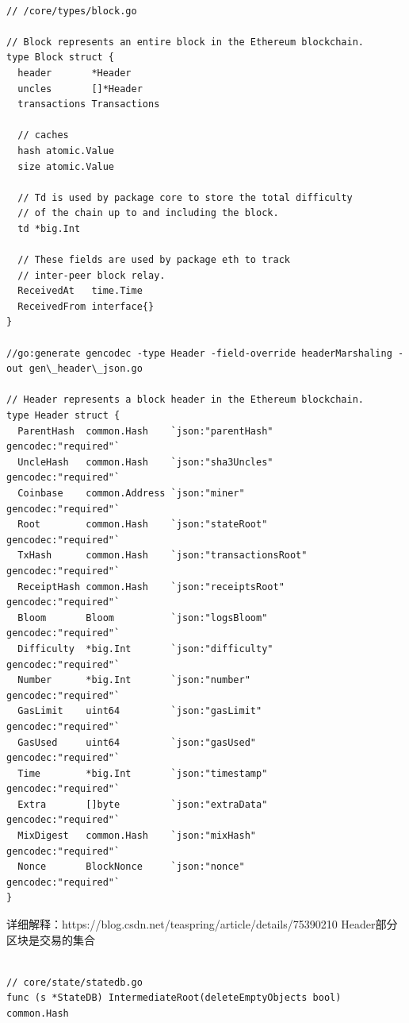 \documentclass[UTF8]{ctexart}
\begin{document}
\begin{lstlisting}

// /core/types/block.go

// Block represents an entire block in the Ethereum blockchain.
type Block struct {
  header       *Header
  uncles       []*Header
  transactions Transactions

  // caches
  hash atomic.Value
  size atomic.Value

  // Td is used by package core to store the total difficulty
  // of the chain up to and including the block.
  td *big.Int

  // These fields are used by package eth to track
  // inter-peer block relay.
  ReceivedAt   time.Time
  ReceivedFrom interface{}
}

//go:generate gencodec -type Header -field-override headerMarshaling -out gen\_header\_json.go

// Header represents a block header in the Ethereum blockchain.
type Header struct {
  ParentHash  common.Hash    `json:"parentHash"       gencodec:"required"`
  UncleHash   common.Hash    `json:"sha3Uncles"       gencodec:"required"`
  Coinbase    common.Address `json:"miner"            gencodec:"required"`
  Root        common.Hash    `json:"stateRoot"        gencodec:"required"`
  TxHash      common.Hash    `json:"transactionsRoot" gencodec:"required"`
  ReceiptHash common.Hash    `json:"receiptsRoot"     gencodec:"required"`
  Bloom       Bloom          `json:"logsBloom"        gencodec:"required"`
  Difficulty  *big.Int       `json:"difficulty"       gencodec:"required"`
  Number      *big.Int       `json:"number"           gencodec:"required"`
  GasLimit    uint64         `json:"gasLimit"         gencodec:"required"`
  GasUsed     uint64         `json:"gasUsed"          gencodec:"required"`
  Time        *big.Int       `json:"timestamp"        gencodec:"required"`
  Extra       []byte         `json:"extraData"        gencodec:"required"`
  MixDigest   common.Hash    `json:"mixHash"          gencodec:"required"`
  Nonce       BlockNonce     `json:"nonce"            gencodec:"required"`
}

\end{lstlisting}

详细解释：https://blog.csdn.net/teaspring/article/details/75390210 Header部分
区块是交易的集合

\begin{lstlisting}

// core/state/statedb.go
func (s *StateDB) IntermediateRoot(deleteEmptyObjects bool) common.Hash

\end{lstlisting}
\end{document}
